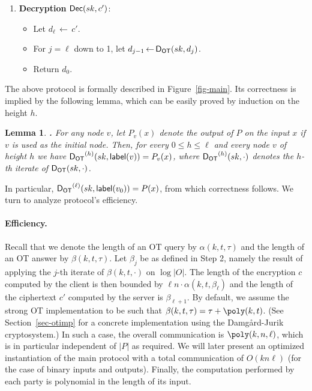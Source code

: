 \documentclass{article}
\newcommand{\height}{{\sf height}}
\newcommand{\ansot}{{\sf A_{OT}}}
\newcommand{\decot}{{\sf D_{OT}}}
\newcommand{\otl}{{\tau}}
\newcommand{\lab}{{\mathsf{label}}}
\newtheorem{LEMMA}{Lemma}[section]
\newenvironment{lemma}{\begin{LEMMA} \hspace{-.85em} {\bf .} \rm}%
	{\end{LEMMA}}
\newcommand{\from}{{\,\leftarrow\,}}
\newcommand{\dec}{{\sf Dec}}
\begin{document}
{\begin{enumerate}
\begin{itemize}
\begin{itemize}
children are labeled.
\item Let $i\from\psi_V(v)$ and $h\from\height(v)$.
\item Let
$\lab(v)\from \ansot(pk,q_i^h,
\lab(u_0),\ldots,\lab(u_{t-1}))$,
where $u_m$ is the (unique) node such that $m\in{\psi_E(v,u_m)}$.
\\Note that the nodes $u_m$ are not necessarily distinct.
\end{itemize}
\item Return $c'=\lab(v_0)$.
\end{itemize}
\item {\bf Decryption} $\dec(sk,c')$:
\begin{itemize}
\item Let $d_\ell\from c'$.
\item For $j=\ell$ down to 1,
let $d_{j-1}\from\decot(sk, d_j)$.
\item Return $d_0$.
\end{itemize}
\end{enumerate}
}

The above protocol is formally described in Figure~\ref{fig-main}.
Its correctness is implied by the following lemma, which can be
easily proved by induction on the height $h$.
\begin{lemma}
\label{lem-correct} For any node $v$, let $P_v(x)$ denote the output
of $P$ on the input $x$ if $v$ is used as the initial node.  Then,
for every $0\le h\le \ell$ and every node $v$ of height $h$ we have
$\decot^{(h)}(sk,\lab(v))=P_v(x)$, where $\decot^{(h)}(sk,\cdot)$
denotes the $h$-th iterate of $\decot(sk,\cdot)$.
\end{lemma}
In particular, $\decot^{(\ell)}(sk,\lab(v_0))=P(x)$, from which
correctness follows. We turn to analyze protocol's efficiency.

\paragraph{Efficiency.} Recall that we denote the length of an OT query by
$\alpha(k,t,\otl)$ and the length of an OT answer by
$\beta(k,t,\otl)$. Let $\beta_j$ be as defined in Step 2, namely the
result of applying the $j$-th iterate of $\beta(k,t,\cdot)$ on
$\log|O|$. The length of the encryption $c$ computed by the client
is then bounded by $\ell n\cdot\alpha(k,t,\beta_\ell)$ and the
length of the ciphertext $c'$ computed by the server is
$\beta_{\ell+1}$. By default, we assume the strong OT implementation
to be such that $\beta(k,t,\otl)=\otl+\poly(k,t)$. (See
Section~\ref{sec-otimp} for a concrete implementation using the
Damg{\aa}rd-Jurik cryptosystem.) In such a case, the overall
communication is $\poly(k,n,\ell)$, which is in particular
independent of $|P|$ as required.  We will later present an
optimized instantiation of the main protocol with a total
communication of $O(kn\ell)$ (for the case of binary inputs and
outputs). Finally, the computation performed by each party is
polynomial in the length of its input.
\end{document}
